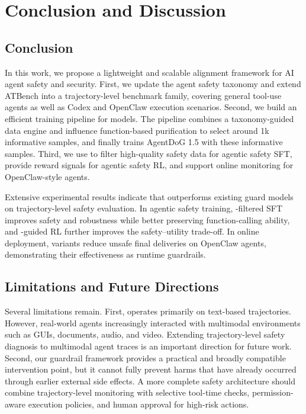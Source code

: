 \section{Conclusion and Discussion}

\subsection{Conclusion}

In this work, we propose a lightweight and scalable alignment framework for AI agent safety and security. First, we update the agent safety taxonomy and extend ATBench into a trajectory-level benchmark family, covering general tool-use agents as well as Codex and OpenClaw execution scenarios. Second, we build an efficient training pipeline for \agentdog{} models. The pipeline combines a taxonomy-guided data engine and influence function-based purification to select around 1k informative samples, and finally trains AgentDoG 1.5 with these informative samples. Third, we use \agentdog{} to filter high-quality safety data for agentic safety SFT, provide reward signals for agentic safety RL, and support online monitoring for OpenClaw-style agents.

Extensive experimental results indicate that \agentdog{} outperforms existing guard models on trajectory-level safety evaluation. In agentic safety training, \agentdog{}-filtered SFT improves safety and robustness while better preserving function-calling ability, and \agentdog{}-guided RL further improves the safety--utility trade-off. In online deployment, \agentdog{} variants reduce unsafe final deliveries on OpenClaw agents, demonstrating their effectiveness as runtime guardrails. 

\subsection{Limitations and Future Directions}

Several limitations remain. First, \agentdog{} operates primarily on text-based trajectories. However, real-world agents increasingly interacted with multimodal environments such as GUIs, documents, audio, and video. Extending trajectory-level safety diagnosis to multimodal agent traces is an important direction for future work. Second, our guardrail framework provides a practical and broadly compatible intervention point, but it cannot fully prevent harms that have already occurred through earlier external side effects. A more complete safety architecture should combine trajectory-level monitoring with selective tool-time checks, permission-aware execution policies, and human approval for high-risk actions.





